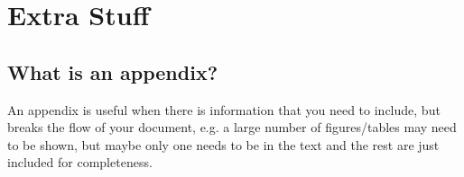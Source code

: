 \documentclass[a4paper,twoside,12pt]{report}
\begin{document}


\appendix
\chapter{Extra Stuff}\label{app:extra}
\section{What is an appendix?}\label{app:whatis}

An appendix is useful when there is information that you need to include, but breaks the flow of your document, e.g. a large number of figures/tables may need to be shown, but maybe only one needs to be in the text and the rest are just included for completeness.

\nocite{*}


\end{document}
